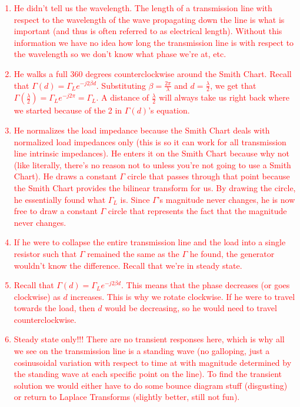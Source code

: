 \documentclass{article}
\begin{document}
\textcolor{red}{
\begin{enumerate}
    \item He didn't tell us the wavelength. The length of a transmission line with respect to the wavelength of the wave propagating down the line is what is important (and thus is often referred to as electrical length). Without this information we have no idea how long the transmission line is with respect to the wavelength so we don't know what phase we're at, etc.
    \item He walks a full 360 degrees counterclockwise around the Smith Chart. Recall that $\Gamma(d) = \Gamma_L e^{-j2\beta d}$. Substituting $\beta = \frac{2 \pi}{\lambda}$ and $d = \frac{\lambda}{2}$, we get that $\Gamma(\frac{\lambda}{2}) = \Gamma_L e^{-j2 \pi} = \Gamma_L$. A distance of $\frac{\lambda}{2}$ will always take us right back where we started because of the 2 in $\Gamma(d)$'s equation.
    \item He normalizes the load impedance because the Smith Chart deals with normalized load impedances only (this is so it can work for all transmission line intrinsic impedances). He enters it on the Smith Chart because why not (like literally, there's no reason not to unless you're not going to use a Smith Chart). He draws a constant $\Gamma$ circle that passes through that point because the Smith Chart provides the bilinear transform for us. By drawing the circle, he essentially found what $\Gamma_L$ is. Since $\Gamma$'s magnitude never changes, he is now free to draw a constant $\Gamma$ circle that represents the fact that the magnitude never changes.
    \item If he were to collapse the entire transmission line and the load into a single resistor such that $\Gamma$ remained the same as the $\Gamma$ he found, the generator wouldn't know the difference. Recall that we're in steady state.
    \item Recall that $\Gamma(d) = \Gamma_L e^{-j2\beta d}$. This means that the phase decreases (or goes clockwise) as $d$ increases. This is why we rotate clockwise. If he were to travel towards the load, then $d$ would be decreasing, so he would need to travel counterclockwise.
    \item Steady state only!!! There are no transient responses here, which is why all we see on the transmission line is a standing wave (no galloping, just a cosinusoidal variation with respect to time at with magnitude determined by the standing wave at each specific point on the line). To find the transient solution we would either have to do some bounce diagram stuff (disgusting) or return to Laplace Transforms (slightly better, still not fun).
\end{enumerate}}
\end{document}
